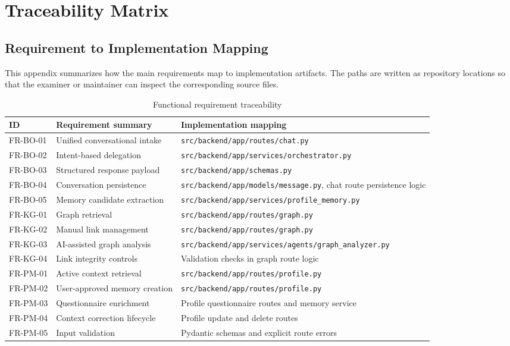 \chapter{Traceability Matrix}

\section{Requirement to Implementation Mapping}

This appendix summarizes how the main requirements map to implementation artifacts. The paths are written as repository locations so that the examiner or maintainer can inspect the corresponding source files.

\begin{longtable}{|p{}|p{}|p{}|}
\caption{Functional requirement traceability}
\label{tab:req-traceability}\\
\hline
\textbf{ID} & \textbf{Requirement summary} & \textbf{Implementation mapping}\\
\hline
FR-BO-01 & Unified conversational intake & \texttt{src/backend/app/routes/chat.py}\\
\hline
FR-BO-02 & Intent-based delegation & \texttt{src/backend/app/services/orchestrator.py}\\
\hline
FR-BO-03 & Structured response payload & \texttt{src/backend/app/schemas.py}\\
\hline
FR-BO-04 & Conversation persistence & \texttt{src/backend/app/models/message.py}, chat route persistence logic\\
\hline
FR-BO-05 & Memory candidate extraction & \texttt{src/backend/app/services/profile\_memory.py}\\
\hline
FR-KG-01 & Graph retrieval & \texttt{src/backend/app/routes/graph.py}\\
\hline
FR-KG-02 & Manual link management & \texttt{src/backend/app/routes/graph.py}\\
\hline
FR-KG-03 & AI-assisted graph analysis & \texttt{src/backend/app/services/agents/graph\_analyzer.py}\\
\hline
FR-KG-04 & Link integrity controls & Validation checks in graph route logic\\
\hline
FR-PM-01 & Active context retrieval & \texttt{src/backend/app/routes/profile.py}\\
\hline
FR-PM-02 & User-approved memory creation & \texttt{src/backend/app/routes/profile.py}\\
\hline
FR-PM-03 & Questionnaire enrichment & Profile questionnaire routes and memory service\\
\hline
FR-PM-04 & Context correction lifecycle & Profile update and delete routes\\
\hline
FR-PM-05 & Input validation & Pydantic schemas and explicit route errors\\
\hline
\end{longtable}

